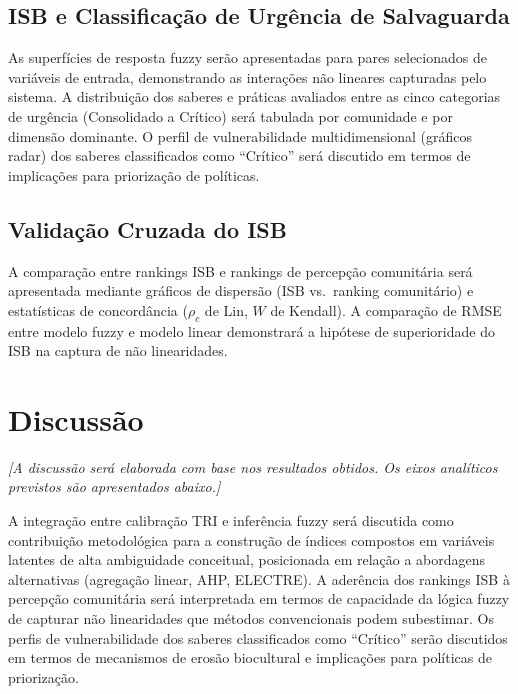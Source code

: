 \documentclass[pdflatex,sn-basic]{sn-jnl}%
\theoremstyle{thmstyleone}%
\theoremstyle{thmstyletwo}%
\theoremstyle{thmstylethree}%
\begin{document}
\subsection{ISB e Classificação de Urgência de Salvaguarda}\label{subsec:res_isb}

As superfícies de resposta fuzzy serão apresentadas para pares selecionados de variáveis de entrada, demonstrando as interações não lineares capturadas pelo sistema. A distribuição dos saberes e práticas avaliados entre as cinco categorias de urgência (Consolidado a Crítico) será tabulada por comunidade e por dimensão dominante. O perfil de vulnerabilidade multidimensional (gráficos radar) dos saberes classificados como ``Crítico'' será discutido em termos de implicações para priorização de políticas.

\subsection{Validação Cruzada do ISB}\label{subsec:res_validacao}

A comparação entre rankings ISB e rankings de percepção comunitária será apresentada mediante gráficos de dispersão (ISB vs.\ ranking comunitário) e estatísticas de concordância ($\rho_c$ de Lin, $W$ de Kendall). A comparação de RMSE entre modelo fuzzy e modelo linear demonstrará a hipótese de superioridade do ISB na captura de não linearidades.


\section{Discussão}\label{sec:discussao}

\textit{[A discussão será elaborada com base nos resultados obtidos. Os eixos analíticos previstos são apresentados abaixo.]}

A integração entre calibração TRI e inferência fuzzy será discutida como contribuição metodológica para a construção de índices compostos em variáveis latentes de alta ambiguidade conceitual, posicionada em relação a abordagens alternativas (agregação linear, AHP, ELECTRE). A aderência dos rankings ISB à percepção comunitária será interpretada em termos de capacidade da lógica fuzzy de capturar não linearidades que métodos convencionais podem subestimar. Os perfis de vulnerabilidade dos saberes classificados como ``Crítico'' serão discutidos em termos de mecanismos de erosão biocultural e implicações para políticas de priorização.
\end{document}
